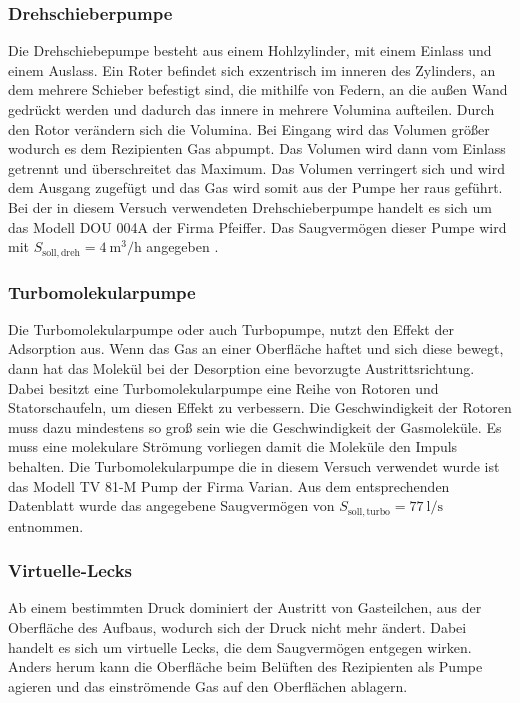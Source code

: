 \subsubsection{Drehschieberpumpe}
Die Drehschiebepumpe besteht aus einem Hohlzylinder, mit einem Einlass und einem Auslass. Ein Roter befindet sich exzentrisch im inneren des Zylinders, an dem mehrere Schieber befestigt sind, die mithilfe von Federn, an die außen Wand gedrückt werden und dadurch das innere in mehrere Volumina aufteilen. Durch den Rotor verändern sich die Volumina. Bei Eingang wird das Volumen größer wodurch es dem Rezipienten Gas abpumpt. Das Volumen wird dann vom Einlass getrennt und überschreitet das Maximum. Das Volumen verringert sich  und wird dem Ausgang zugefügt und das Gas wird somit aus der Pumpe her raus geführt.
Bei der in diesem Versuch verwendeten Drehschieberpumpe handelt es sich um das Modell DOU 004A der Firma Pfeiffer. Das Saugvermögen dieser Pumpe wird mit $S_{\mathrm{soll,dreh}} =\SI{4}{\m\cubed\per\hour}$ angegeben \cite{PlaketteV70}.


\subsubsection{Turbomolekularpumpe}
Die Turbomolekularpumpe oder auch Turbopumpe, nutzt den Effekt der Adsorption aus. Wenn das Gas an einer Oberfläche haftet und sich diese bewegt, dann hat das Molekül bei der Desorption eine bevorzugte Austrittsrichtung. Dabei besitzt eine Turbomolekularpumpe eine Reihe von Rotoren und Statorschaufeln, um diesen Effekt zu verbessern. Die Geschwindigkeit der Rotoren muss dazu mindestens so groß sein wie die Geschwindigkeit der Gasmoleküle. Es muss eine molekulare Strömung vorliegen damit die Moleküle den Impuls behalten.
Die Turbomolekularpumpe die in diesem Versuch verwendet wurde ist
das Modell TV 81-M Pump der Firma Varian. Aus dem entsprechenden Datenblatt 
\cite{DatenblattV70} wurde das angegebene Saugvermögen von 	
$S_{\mathrm{soll,turbo}} = \SI{77}{\l\per\s}$ entnommen.

\subsubsection{Virtuelle-Lecks}
Ab einem bestimmten Druck dominiert der Austritt von Gasteilchen, aus der Oberfläche des Aufbaus, wodurch sich der  Druck nicht mehr ändert. Dabei handelt es sich um virtuelle Lecks, die dem Saugvermögen entgegen wirken. Anders herum kann die Oberfläche beim Belüften des Rezipienten als Pumpe agieren und das einströmende Gas auf den Oberflächen ablagern.
